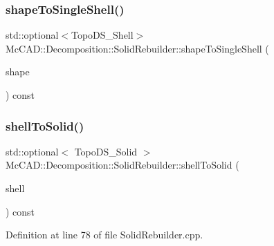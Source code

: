 \subsubsection{\texorpdfstring{shape\+To\+Single\+Shell()}{shapeToSingleShell()}\hspace{0.1cm}{\footnotesize\ttfamily [2/2]}}
{\footnotesize\ttfamily std\+::optional$<$Topo\+D\+S\+\_\+\+Shell$>$ Mc\+C\+A\+D\+::\+Decomposition\+::\+Solid\+Rebuilder\+::shape\+To\+Single\+Shell (\begin{DoxyParamCaption}\item[{const Topo\+D\+S\+\_\+\+Shape \&}]{shape }\end{DoxyParamCaption}) const\hspace{0.3cm}{\ttfamily [private]}}

\mbox{\label{classMcCAD_1_1Decomposition_1_1SolidRebuilder_af37e601d9e3fa7309e7a02f95d8faa61}} 
\subsubsection{\texorpdfstring{shell\+To\+Solid()}{shellToSolid()}\hspace{0.1cm}{\footnotesize\ttfamily [1/2]}}
{\footnotesize\ttfamily std\+::optional$<$ Topo\+D\+S\+\_\+\+Solid $>$ Mc\+C\+A\+D\+::\+Decomposition\+::\+Solid\+Rebuilder\+::shell\+To\+Solid (\begin{DoxyParamCaption}\item[{const Topo\+D\+S\+\_\+\+Shell \&}]{shell }\end{DoxyParamCaption}) const\hspace{0.3cm}{\ttfamily [private]}}



Definition at line 78 of file Solid\+Rebuilder.\+cpp.


